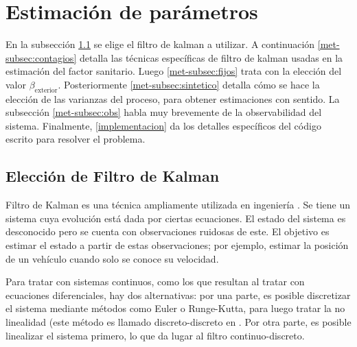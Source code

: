 \section{Estimación de parámetros} \label{met:estimacion}


En la subsección \ref{met-subsec:kalman} se elige el filtro de kalman a utilizar. A continuación \ref{met-subsec:contagios} detalla las técnicas específicas de filtro de kalman usadas en la estimación del factor sanitario. Luego \ref{met-subsec:fijos} trata con la elección del valor \(\beta_{\text{exterior}}\). Posteriormente \ref{met-subsec:sintetico} detalla cómo se hace la elección de las varianzas del proceso, para obtener estimaciones con sentido. La subsección \ref{met-subsec:obs} habla muy brevemente de la observabilidad del sistema. Finalmente, \ref{implementacion} da los detalles específicos del código escrito para resolver el problema.



\subsection{Elección de Filtro de Kalman}\label{met-subsec:kalman}





Filtro de Kalman \cite{Kalman1960} es una técnica ampliamente utilizada en ingeniería \cite{Auger2013}. Se tiene un sistema cuya evolución está dada por ciertas ecuaciones. El estado del sistema es desconocido pero se cuenta con observaciones ruidosas de este. El objetivo es estimar el estado a partir de estas observaciones; por ejemplo, estimar la posición de un vehículo cuando solo se conoce su velocidad.

Para tratar con sistemas continuos, como los que resultan al tratar con ecuaciones diferenciales, hay dos alternativas: por una parte, es posible discretizar el sistema mediante métodos como Euler o Runge-Kutta, para luego tratar la no linealidad (este método es llamado discreto-discreto en \cite{Kulikov2014}. Por otra parte, es posible linealizar el sistema primero, lo que da lugar al filtro continuo-discreto.


